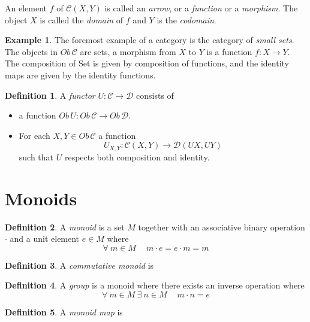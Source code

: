 \documentclass{article}
\theoremstyle{definition}
\newtheorem{definition}{Definition}[section]
\newtheorem{example}{Example}[section]
\begin{document}
\par
An element $f$ of $\mathcal{C}(X,Y)$ is called an \textit{arrow}, or a \textit{function}
or a \textit{morphism}. The object $X$ is called the \textit{domain} of $f$ and $Y$ is
the \textit{codomain}.

\begin{example}
	The foremost example of a category is the category of \textit{small sets}.
	The objects in $Ob\,\mathcal{C}$ are sets,
	a morphism from $X$ to $Y$ is a function $f : X \rightarrow Y$.
	The composition of Set is given by composition of functions,
	and the identity maps are given by the identity functions.
\end{example}





\begin{definition}
	A \textit{functor} $U : \mathcal{C} \rightarrow \mathcal{D}$ consists of
	\begin{itemize}
		\item a function $Ob\,U : Ob\,\mathcal{C} \rightarrow Ob\,\mathcal{D}$.
		\item For each $X, Y \in Ob\,\mathcal{C}$ a function
			$$U_{X,Y} : \mathcal{C}(X,Y) \rightarrow \mathcal{D}(UX, UY)$$
			such that $U$ respects both composition and identity.
	\end{itemize}
\end{definition}

\section{Monoids}

\begin{definition}
	A \textit{monoid} is a set $M$ together with an associative binary operation $\cdot$ and
	a unit element $e \in M$ where
	$$\forall\: m \in M\: \quad m \cdot e = e \cdot m = m$$
\end{definition}

\begin{definition}
    A \textit{commutative monoid} is 
\end{definition}

\begin{definition}
	A \textit{group} is a monoid where there exists an inverse operation where
	$$\forall\: m \in M\: \exists\: n \in M\: \quad m \cdot n = e$$
\end{definition}

\begin{definition}
    A \textit{monoid map} is
\end{definition}
\end{document}
